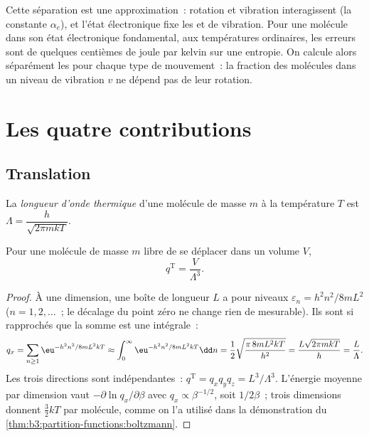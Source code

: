 Cette séparation est une approximation~: rotation et vibration
interagissent (la constante $\alpha_e$), et l'état électronique fixe les
 et de vibration. Pour une molécule dans son état
électronique fondamental, aux températures ordinaires, les erreurs sont
de quelques centièmes de joule par kelvin sur une entropie. On calcule
alors séparément les  pour chaque type de mouvement~: la
fraction des molécules dans un niveau de vibration $v$ ne dépend pas de
leur rotation.

\section{Les quatre contributions}

\subsection*{Translation}

\begin{definition}\label{def:b3:partition-functions:thermal-wavelength}
La \emph{longueur d'onde thermique} d'une
molécule de masse $m$ à la
température $T$ est $\Lambda = \dfrac{h}{\sqrt{2\pi mkT}}$.
\end{definition}

\begin{proposition}\label{prop:b3:partition-functions:q-trans}
Pour une molécule de masse $m$ libre de se déplacer dans un volume $V$,
\[
  q^{\mathrm T} = \frac{V}{\Lambda^3}.
\]
\end{proposition}

\begin{proof}
À une dimension, une boîte de longueur $L$ a pour niveaux
$\varepsilon_n = h^2n^2/8mL^2$
($n = 1, 2, \dots$~; le décalage du point zéro ne change rien de
mesurable). Ils sont si rapprochés que la somme est une intégrale~:
\[
  q_x = \sum_{n\ge1}\eu^{-h^2n^2/8mL^2kT} \approx \int_0^\infty\eu^{-h^2n^2/8mL^2kT}\dd n
      = \frac12\sqrt{\frac{\pi\,8mL^2kT}{h^2}} = \frac{L\sqrt{2\pi mkT}}{h} = \frac{L}{\Lambda}.
\]
Les trois directions sont indépendantes~: $q^{\mathrm T} = q_xq_yq_z = L^3/\Lambda^3$.
L'énergie moyenne par dimension vaut $-\partial\ln q_x/\partial\beta$
avec $q_x \propto \beta^{-1/2}$, soit
$1/2\beta$~; trois dimensions donnent $\frac32kT$ par molécule, comme on
l'a utilisé dans la démonstration du
\cref{thm:b3:partition-functions:boltzmann}.
\end{proof}

